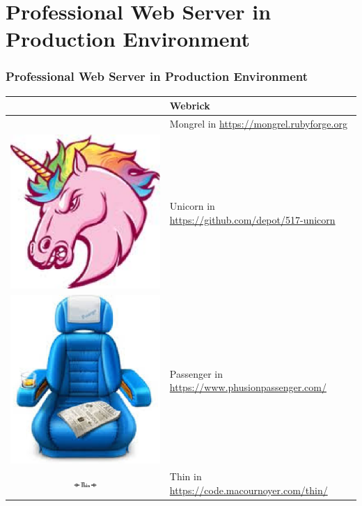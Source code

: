 \documentclass{beamer}
\begin{document}
\section{Professional Web Server in Production Environment}
\begin{frame}[fragile]
\frametitle{Professional Web Server in Production Environment}

\begin{tabular}{|c|l|} \hline
 & Webrick \\ \hline
 & Mongrel in \href{https://mongrel.rubyforge.org}{https://mongrel.rubyforge.org}\\ \hline
\includegraphics[width=0.15 \textwidth]{unicorn.eps} & Unicorn in \href{https://github.com/depot/517-unicorn}{https://github.com/depot/517-unicorn} \\ \hline
\includegraphics[width=0.15 \textwidth]{passenger.eps} & Passenger in \href{https://www.phusionpassenger.com/}{https://www.phusionpassenger.com/} \\ \hline
\includegraphics[width=0.15\textwidth]{thin.eps}  & Thin in \href{https://code.macournoyer.com/thin/}{https://code.macournoyer.com/thin/} \\ \hline
\end{tabular}


\end{frame}
\end{document}
